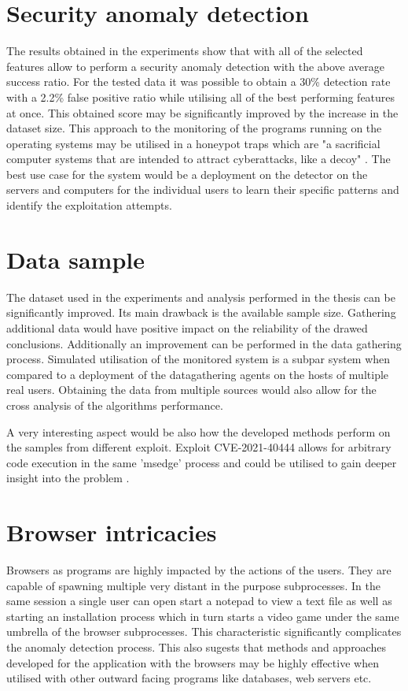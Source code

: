 \documentclass[a4paper,twoside,12pt]{book}
\begin{document}
\section{Security anomaly detection}

The results obtained in the experiments show that with all of the selected features allow 
to perform a security anomaly detection with the above average success ratio. For the tested
data it was possible to obtain a 30\% detection rate with a 2.2\% false positive ratio while
utilising all of the best performing features at once. This obtained score may be significantly 
improved by the increase in the dataset size. This approach to the monitoring of the programs 
running on the operating systems may be utilised in a honeypot traps which are "a sacrificial 
computer systems that are intended to attract cyberattacks, like a decoy" \cite{bib:Honeypot}. 
The best use case for the system would be a deployment on the detector on the servers and 
computers for the individual users to learn their specific patterns and identify the exploitation
attempts.

\section{Data sample}

The dataset used in the experiments and analysis performed in the thesis can be significantly 
improved. Its main drawback is the available sample size. Gathering additional data would have
positive impact on the reliability of the drawed conclusions. Additionally an improvement 
can be performed in the data gathering process. Simulated utilisation of the monitored system
is a subpar system when compared to a deployment of the datagathering agents on the hosts of 
multiple real users. Obtaining the data from multiple sources would also allow for the cross
analysis of the algorithms performance. 

A very interesting aspect would be also how the developed methods perform on the samples from 
different exploit. Exploit CVE-2021-40444 allows for arbitrary code execution in the same 'msedge'
process and could be utilised to gain deeper insight into the problem \cite{bib:newEdgeExploit}.

\section{Browser intricacies}

Browsers as programs are highly impacted by the actions of the users. They are capable of spawning
multiple very distant in the purpose subprocesses. In the same session a single user can open start
a notepad to view a text file as well as starting an installation process which in turn starts a 
video game under the same umbrella of the browser subprocesses. This characteristic significantly
complicates the anomaly detection process. This also sugests that methods and approaches developed
for the application with the browsers may be highly effective when utilised with other outward 
facing programs like databases, web servers etc.
\end{document}
